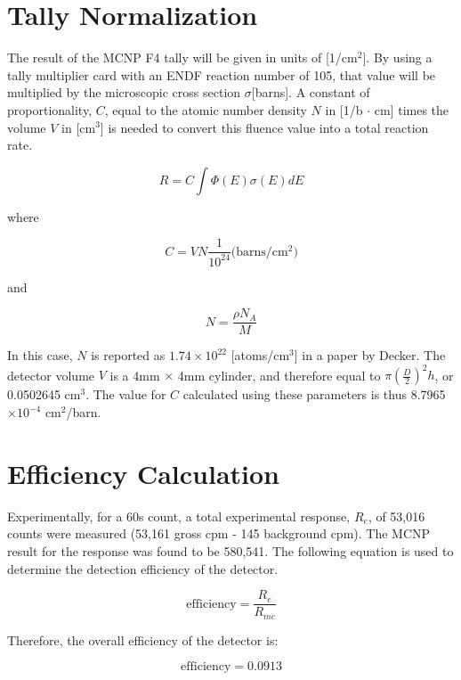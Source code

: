 \documentclass[a4paper, 11pt]{article}
\begin{document}
\section{Tally Normalization}

The result of the MCNP F4 tally will be given in units of [1/cm$^2$]. By using a tally multiplier card with an ENDF reaction number of 105, that value will be multiplied by the microscopic cross section $\sigma$[barns]. A constant of proportionality, $C$, equal to the atomic number density $N$ in [1/b $\cdot$ cm] times the volume $V$ in [cm$^3$] is needed to convert this fluence value into a total reaction rate.

$$ R = C \int \Phi(E) \sigma(E) dE $$

where

$$ C = V N \frac{1}{10^{24}} \textrm{(barns/cm$^2$)} $$

and

$$ N = \frac{\rho N_A}{M} $$

In this case, $N$ is reported as $1.74 \times 10^{22}$ [atoms/cm$^3$] in a paper by Decker. The detector volume $V$ is a 4mm $\times$ 4mm cylinder, and therefore equal to $\pi (\frac{D}{2})^2 h$, or 0.0502645 cm$^3$. The value for $C$ calculated using these parameters is thus 8.7965 $\times 10^{-4}$ cm$^2$/barn.

\section{Efficiency Calculation}

Experimentally, for a 60s count, a total experimental response, $R_e$, of 53,016 counts were measured (53,161 gross cpm - 145 background cpm). The MCNP result for the response was found to be 580,541. The following equation is used to determine the detection efficiency of the detector.

$$ \textrm{efficiency} = \frac{R_{e}}{R_{mc}} $$

Therefore, the overall efficiency of the detector is:

$$ \textrm{efficiency} = 0.0913 $$
\end{document}
